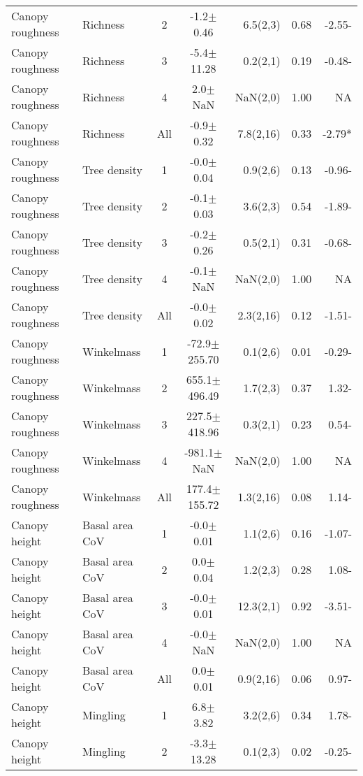 \begin{longtable}{llcS[table-format=5.1(4.2)]rS[table-format=1.2]r}
  Canopy roughness & Richness & 2 & -1.2$\pm$0.46 & 6.5(2,3) & 0.68 & -2.55- \\ 
  Canopy roughness & Richness & 3 & -5.4$\pm$11.28 & 0.2(2,1) & 0.19 & -0.48- \\ 
  Canopy roughness & Richness & 4 & 2.0$\pm$NaN & NaN(2,0) & 1.00 & NA \\ 
  Canopy roughness & Richness & All & -0.9$\pm$0.32 & 7.8(2,16) & 0.33 & -2.79* \\ 
   \midrule
Canopy roughness & Tree density & 1 & -0.0$\pm$0.04 & 0.9(2,6) & 0.13 & -0.96- \\ 
  Canopy roughness & Tree density & 2 & -0.1$\pm$0.03 & 3.6(2,3) & 0.54 & -1.89- \\ 
  Canopy roughness & Tree density & 3 & -0.2$\pm$0.26 & 0.5(2,1) & 0.31 & -0.68- \\ 
  Canopy roughness & Tree density & 4 & -0.1$\pm$NaN & NaN(2,0) & 1.00 & NA \\ 
  Canopy roughness & Tree density & All & -0.0$\pm$0.02 & 2.3(2,16) & 0.12 & -1.51- \\ 
   \midrule
Canopy roughness & Winkelmass & 1 & -72.9$\pm$255.70 & 0.1(2,6) & 0.01 & -0.29- \\ 
  Canopy roughness & Winkelmass & 2 & 655.1$\pm$496.49 & 1.7(2,3) & 0.37 & 1.32- \\ 
  Canopy roughness & Winkelmass & 3 & 227.5$\pm$418.96 & 0.3(2,1) & 0.23 & 0.54- \\ 
  Canopy roughness & Winkelmass & 4 & -981.1$\pm$NaN & NaN(2,0) & 1.00 & NA \\ 
  Canopy roughness & Winkelmass & All & 177.4$\pm$155.72 & 1.3(2,16) & 0.08 & 1.14- \\ 
   \midrule
Canopy height & Basal area CoV & 1 & -0.0$\pm$0.01 & 1.1(2,6) & 0.16 & -1.07- \\ 
  Canopy height & Basal area CoV & 2 & 0.0$\pm$0.04 & 1.2(2,3) & 0.28 & 1.08- \\ 
  Canopy height & Basal area CoV & 3 & -0.0$\pm$0.01 & 12.3(2,1) & 0.92 & -3.51- \\ 
  Canopy height & Basal area CoV & 4 & -0.0$\pm$NaN & NaN(2,0) & 1.00 & NA \\ 
  Canopy height & Basal area CoV & All & 0.0$\pm$0.01 & 0.9(2,16) & 0.06 & 0.97- \\ 
   \midrule
Canopy height & Mingling & 1 & 6.8$\pm$3.82 & 3.2(2,6) & 0.34 & 1.78- \\ 
  Canopy height & Mingling & 2 & -3.3$\pm$13.28 & 0.1(2,3) & 0.02 & -0.25- \\ 

\end{longtable}

